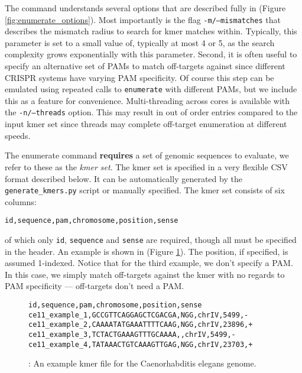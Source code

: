 \documentclass[11pt]{article}
\begin{document}
The command understands several options that are described fully in
(Figure \ref{fig:enumerate_options}). Most importantly is the flag
\texttt{-m/--mismatches} that describes the mismatch radius to search
for kmer matches within. Typically, this parameter is set to a small
value of, typically at most 4 or 5, as the search complexity grows
exponentially with this parameter. Second, it is often useful to
specify an alternative set of PAMs to match off-targets against since
different CRISPR systems have varying PAM specificity. Of course this
step can be emulated using repeated calls to \texttt{enumerate} with
different PAMs, but we include this as a feature for
convenience. Multi-threading across cores is available with the
\texttt{-n/--threads} option. This may result in out of order entries
compared to the input kmer set since threads may complete off-target
enumeration at different speeds.

The enumerate command {\bf requires} a set of genomic sequences to
evaluate, we refer to these as the {\it kmer set}. The kmer set is
specified in a very flexible CSV format described below. It can be
automatically generated by the \texttt{generate\_kmers.py} script
or manually specified. The kmer set consists of six columns:

\begin{center}
  \texttt{id,sequence,pam,chromosome,position,sense} 
\end{center}

of which only \texttt{id}, \texttt{sequence} and \texttt{sense} are
required, though all must be specified in the header. An example is
shown in (Figure \ref{fig:kmer_set}). The position, if specified, is
assumed 1-indexed. Notice that for the third example, we don't specify
a PAM. In this case, we simply match off-targets against the kmer with
no regards to PAM specificity --- off-targets don't need a PAM.

\begin{figure}[ht]
  \centering
  \begin{verbatim}
id,sequence,pam,chromosome,position,sense
ce11_example_1,GCCGTTCAGGAGCTCGACGA,NGG,chrIV,5499,-
ce11_example_2,CAAAATATGAAATTTTCAAG,NGG,chrIV,23896,+
ce11_example_3,TCTACTGAAAGTTTGCAAAA,,chrIV,5499,-
ce11_example_4,TATAAACTGTCAAAGTTGAG,NGG,chrIV,23703,+
  \end{verbatim}
  \caption{\label{fig:kmer_set}: An example kmer file for the
    Caenorhabditis elegans genome.}
\end{figure}
\end{document}
